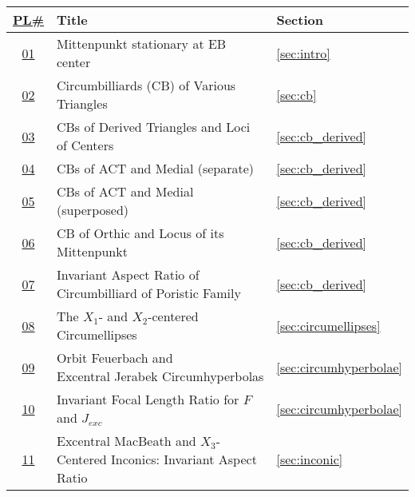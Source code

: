 \begin{table}
\begin{tabular}{c|l|l}
\href{https://bit.ly/2NOOIOX}{PL\#} & Title & Section\\
\hline

\href{https://youtu.be/tMrBqfRBYik}{01} &
{Mittenpunkt stationary at EB center} & \ref{sec:intro} \\

\href{https://youtu.be/vSCnorIJ2X8}{02} &
{Circumbilliards (CB) of Various Triangles} &
\ref{sec:cb} \\

\href{https://youtu.be/Og7xLgkrLqw}{03} &
{CBs of Derived Triangles and Loci of Centers} &
\ref{sec:cb_derived} \\

\href{https://youtu.be/xyHUwpvAj3g}{04} & CBs of ACT and Medial (separate) &
\ref{sec:cb_derived} \\

\href{https://youtu.be/e-mToZlkHtc}{05} &
CBs of ACT and Medial (superposed) & \ref{sec:cb_derived} \\

\href{https://youtu.be/5KL8st2vIb0}{06} &
{CB of Orthic and Locus of its Mittenpunkt} &
\ref{sec:cb_derived} \\

\href{https://youtu.be/yEu2aPiJwQo}{07} & \makecell[lt]{Invariant Aspect Ratio of \\Circumbilliard of Poristic Family} &
\ref{sec:cb_derived} \\

\href{https://youtu.be/P_Io7HsWGnQ}{08} &
{The $X_1$- and $X_2$-centered Circumellipses} &
\ref{sec:circumellipses} \\

\href{https://youtu.be/Pz4tUijYZCA}{09} &
\makecell[lt]{Orbit Feuerbach and \\ Excentral Jerabek Circumhyperbolas} &
\ref{sec:circumhyperbolae} \\


\href{https://youtu.be/ewioM6-nCpY}{10} &
Invariant Focal Length Ratio for $F$ and $J_{exc}$ &
\ref{sec:circumhyperbolae} \\

\href{https://youtu.be/CHbrZvx1I8w}{11} &
\makecell[lt]{
Excentral MacBeath and $X_3$-Centered\\Inconics: Invariant Aspect Ratio
} &
\ref{sec:inconic} \\


\end{tabular}
\end{table}
